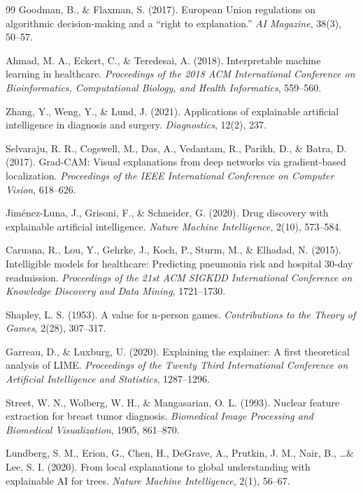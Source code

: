 \documentclass[journal]{IEEEtran}
\begin{document}
\begin{thebibliography}{99}
Goodman, B., \& Flaxman, S. (2017). European Union regulations on algorithmic decision-making and a ``right to explanation.'' \textit{AI Magazine}, 38(3), 50--57.

Ahmad, M. A., Eckert, C., \& Teredesai, A. (2018). Interpretable machine learning in healthcare. \textit{Proceedings of the 2018 ACM International Conference on Bioinformatics, Computational Biology, and Health Informatics}, 559--560.

Zhang, Y., Weng, Y., \& Lund, J. (2021). Applications of explainable artificial intelligence in diagnosis and surgery. \textit{Diagnostics}, 12(2), 237.

Selvaraju, R. R., Cogswell, M., Das, A., Vedantam, R., Parikh, D., \& Batra, D. (2017). Grad-CAM: Visual explanations from deep networks via gradient-based localization. \textit{Proceedings of the IEEE International Conference on Computer Vision}, 618--626.

Jiménez-Luna, J., Grisoni, F., \& Schneider, G. (2020). Drug discovery with explainable artificial intelligence. \textit{Nature Machine Intelligence}, 2(10), 573--584.

Caruana, R., Lou, Y., Gehrke, J., Koch, P., Sturm, M., \& Elhadad, N. (2015). Intelligible models for healthcare: Predicting pneumonia risk and hospital 30-day readmission. \textit{Proceedings of the 21st ACM SIGKDD International Conference on Knowledge Discovery and Data Mining}, 1721--1730.

Shapley, L. S. (1953). A value for n-person games. \textit{Contributions to the Theory of Games}, 2(28), 307--317.

Garreau, D., \& Luxburg, U. (2020). Explaining the explainer: A first theoretical analysis of LIME. \textit{Proceedings of the Twenty Third International Conference on Artificial Intelligence and Statistics}, 1287--1296.

Street, W. N., Wolberg, W. H., \& Mangasarian, O. L. (1993). Nuclear feature extraction for breast tumor diagnosis. \textit{Biomedical Image Processing and Biomedical Visualization}, 1905, 861--870.

Lundberg, S. M., Erion, G., Chen, H., DeGrave, A., Prutkin, J. M., Nair, B., \ldots \& Lee, S. I. (2020). From local explanations to global understanding with explainable AI for trees. \textit{Nature Machine Intelligence}, 2(1), 56--67.


\end{thebibliography}
\end{document}
